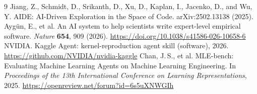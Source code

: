 \documentclass[11pt,a4paper]{article}
\begin{document}
{\small
\begin{thebibliography}{9}
 Jiang, Z., Schmidt, D., Srikanth, D., Xu, D., Kaplan, I., Jacenko, D., and Wu, Y. AIDE: AI-Driven Exploration in the Space of Code. arXiv:2502.13138 (2025).
 Ayg\"un, E., et al. An AI system to help scientists write expert-level empirical software. \emph{Nature} \textbf{654}, 909 (2026). \url{https://doi.org/10.1038/s41586-026-10658-6}
 NVIDIA. Kaggle Agent: kernel-reproduction agent skill (software), 2026. \url{https://github.com/NVIDIA/nvidia-kaggle}
 Chan, J.\,S., et al. MLE-bench: Evaluating Machine Learning Agents on Machine Learning Engineering. In \emph{Proceedings of the 13th International Conference on Learning Representations}, 2025. \url{https://openreview.net/forum?id=6s5uXNWGIh}
\end{thebibliography}}
\end{document}
